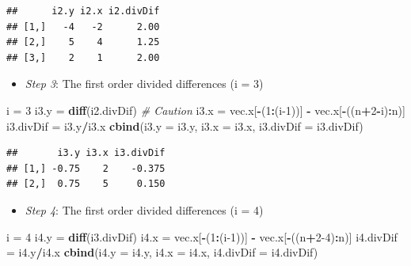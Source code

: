 \documentclass[
]{book}
\newenvironment{Shaded}{\begin{snugshade}}{\end{snugshade}}
\newcommand{\AttributeTok}[1]{\textcolor[rgb]{0.13,0.29,0.53}{#1}}
\newcommand{\CommentTok}[1]{\textcolor[rgb]{0.56,0.35,0.01}{\textit{#1}}}
\newcommand{\DecValTok}[1]{\textcolor[rgb]{0.00,0.00,0.81}{#1}}
\newcommand{\FunctionTok}[1]{\textcolor[rgb]{0.13,0.29,0.53}{\textbf{#1}}}
\newcommand{\NormalTok}[1]{#1}
\newcommand{\OtherTok}[1]{\textcolor[rgb]{0.56,0.35,0.01}{#1}}
\newcommand{\SpecialCharTok}[1]{\textcolor[rgb]{0.81,0.36,0.00}{\textbf{#1}}}
\providecommand{\tightlist}{%
  \setlength{\itemsep}{0pt}\setlength{\parskip}{0pt}}
\begin{document}
\begin{verbatim}
##      i2.y i2.x i2.divDif
## [1,]   -4   -2      2.00
## [2,]    5    4      1.25
## [3,]    2    1      2.00
\end{verbatim}

\begin{itemize}
\tightlist
\item
  \emph{Step 3}: The first order divided differences (i = 3)
\end{itemize}

\begin{Shaded}
\begin{Highlighting}[]
\NormalTok{i }\OtherTok{=} \DecValTok{3}
\NormalTok{i3.y }\OtherTok{=} \FunctionTok{diff}\NormalTok{(i2.divDif)    }\CommentTok{\# Caution }
\NormalTok{i3.x }\OtherTok{=}\NormalTok{ vec.x[}\SpecialCharTok{{-}}\NormalTok{(}\DecValTok{1}\SpecialCharTok{:}\NormalTok{(i}\DecValTok{{-}1}\NormalTok{))] }\SpecialCharTok{{-}}\NormalTok{ vec.x[}\SpecialCharTok{{-}}\NormalTok{((n}\SpecialCharTok{+}\DecValTok{2}\SpecialCharTok{{-}}\NormalTok{i)}\SpecialCharTok{:}\NormalTok{n)]}
\NormalTok{i3.divDif }\OtherTok{=}\NormalTok{ i3.y}\SpecialCharTok{/}\NormalTok{i3.x}
\FunctionTok{cbind}\NormalTok{(}\AttributeTok{i3.y =}\NormalTok{ i3.y, }\AttributeTok{i3.x =}\NormalTok{ i3.x, }\AttributeTok{i3.divDif =}\NormalTok{ i3.divDif)}
\end{Highlighting}
\end{Shaded}

\begin{verbatim}
##       i3.y i3.x i3.divDif
## [1,] -0.75    2    -0.375
## [2,]  0.75    5     0.150
\end{verbatim}

\begin{itemize}
\tightlist
\item
  \emph{Step 4}: The first order divided differences (i = 4)
\end{itemize}

\begin{Shaded}
\begin{Highlighting}[]
\NormalTok{i }\OtherTok{=} \DecValTok{4}
\NormalTok{i4.y }\OtherTok{=} \FunctionTok{diff}\NormalTok{(i3.divDif)            }
\NormalTok{i4.x }\OtherTok{=}\NormalTok{ vec.x[}\SpecialCharTok{{-}}\NormalTok{(}\DecValTok{1}\SpecialCharTok{:}\NormalTok{(i}\DecValTok{{-}1}\NormalTok{))] }\SpecialCharTok{{-}}\NormalTok{ vec.x[}\SpecialCharTok{{-}}\NormalTok{((n}\SpecialCharTok{+}\DecValTok{2{-}4}\NormalTok{)}\SpecialCharTok{:}\NormalTok{n)]}
\NormalTok{i4.divDif }\OtherTok{=}\NormalTok{ i4.y}\SpecialCharTok{/}\NormalTok{i4.x}
\FunctionTok{cbind}\NormalTok{(}\AttributeTok{i4.y =}\NormalTok{ i4.y, }\AttributeTok{i4.x =}\NormalTok{ i4.x, }\AttributeTok{i4.divDif =}\NormalTok{ i4.divDif)}
\end{Highlighting}
\end{Shaded}
\end{document}
